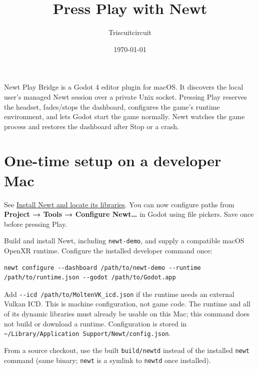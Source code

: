 \documentclass[11pt]{article}
\author{Triscuitcircuit}
\date{\today}
\title{Press Play with Newt}
\begin{document}
\maketitle
\tableofcontents

\clearpage

Newt Play Bridge is a Godot 4 editor plugin for macOS. It discovers the local user's managed Newt session over a private Unix socket. Pressing Play reserves the headset, fades/stops the dashboard, configures the game's runtime environment, and lets Godot start the game normally. Newt watches the game process and restores the dashboard after Stop or a crash.
\section{One-time setup on a developer Mac}
\label{sec:org4a53808}
See \href{INSTALL.md}{Install Newt and locate its libraries}. You can now configure paths from \textbf{Project → Tools → Configure Newt…} in Godot using file pickers. Save once before pressing Play.

Build and install Newt, including \texttt{newt-demo}, and supply a compatible macOS OpenXR runtime. Configure the installed developer command once:
\begin{verbatim}
newt configure --dashboard /path/to/newt-demo --runtime /path/to/runtime.json --godot /path/to/Godot.app
\end{verbatim}
Add \texttt{-{}-{}icd /path/to/MoltenVK\_icd.json} if the runtime needs an external Vulkan ICD. This is machine configuration, not game code. The runtime and all of its dynamic libraries must already be usable on this Mac; this command does not build or download a runtime. Configuration is stored in \texttt{\textasciitilde{}/Library/Application Support/Newt/config.json}.

From a source checkout, use the built \texttt{build/newtd} instead of the installed \texttt{newt} command (same binary; \texttt{newt} is a symlink to \texttt{newtd} once installed).
\end{document}
